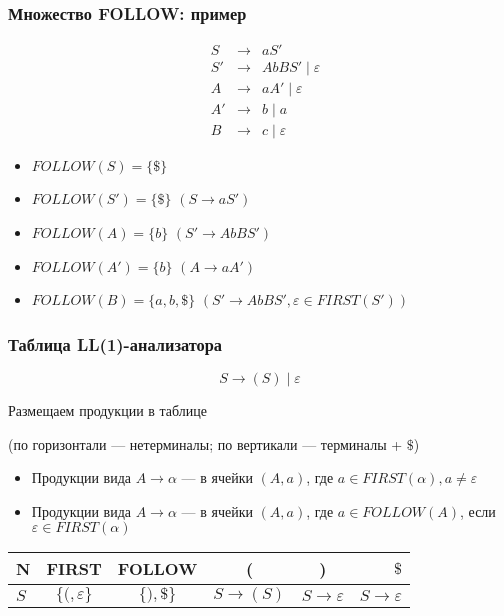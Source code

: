 \documentclass{beamer}
\begin{document}
\begin{frame}[fragile]
  \transwipe[direction=90]
  \frametitle{Множество FOLLOW: пример}
  \[
  \begin{array}{crcl}
  &S  & \to & a S' \\
  
  &S' & \to & A b B S' \mid \varepsilon \\
  
  &A  & \to & a A' \mid \varepsilon \\
  &A' & \to & b \mid a \\
  &B  & \to & c \mid \varepsilon  
  \end{array}
  \] \pause
  
  \begin{itemize}
    \item $FOLLOW(S) = \{ \$ \}$ \pause
    \item $FOLLOW(S') = \{ \$ \}$ \hfill $(S \to a S')$  \pause
    \item $FOLLOW(A) = \{ b \}$ \hfill $(S' \to A b B S')$ \pause
    \item $FOLLOW(A') = \{ b \}$ \hfill $(A \to a A')$ \pause
    \item $FOLLOW(B) = \{ a, b, \$ \}$ \hfill $(S' \to A b B S', \varepsilon \in FIRST(S'))$ 
  \end{itemize}
\end{frame}

\begin{frame}[fragile]
  \transwipe[direction=90]
  \frametitle{Таблица LL(1)-анализатора}
  \[
  S \to ( S ) \mid \varepsilon
  \] 
  
\vfill
   
  \begin{center}    
    Размещаем продукции в таблице 
    
    (по горизонтали --- нетерминалы; по вертикали --- терминалы + $\$ $)
  \end{center}

  \begin{itemize}
    \item Продукции вида $A \to \alpha$ --- в ячейки $(A, a)$, где $a \in FIRST(\alpha), a \neq \varepsilon$
    \item Продукции вида $A \to \alpha$ --- в ячейки $(A, a)$, где $a \in FOLLOW(A)$, если $\varepsilon \in FIRST(\alpha)$
  \end{itemize}   

  \vfill
  
\begin{center}
\begin{tabular}{ l || c | c || c | c | r }
  N & FIRST & FOLLOW & ( & ) & $\$ $ \\ \hline  
  $S$ & \pause $\{ (, \varepsilon \}$ & $\{ ), \$ \}$ & \pause $S \to (S)$ & \pause $S \to \varepsilon$ & $S \to \varepsilon$ 
\end{tabular} 
\end{center} 
\end{frame}  
\end{document}
